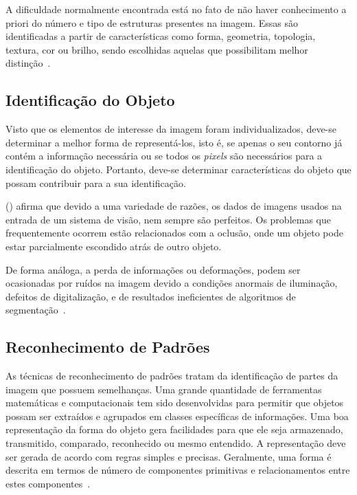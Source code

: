 A dificuldade normalmente encontrada está no fato de não haver conhecimento a priori do número e tipo de estruturas presentes na imagem. Essas são identificadas a partir de características como forma, geometria, topologia, textura, cor ou brilho, sendo escolhidas aquelas que possibilitam melhor distinção~\cite{heinen2004navegaccao}.

\subsection{Identificação do Objeto}
\label{subsec:idObjeto}

Visto que os elementos de interesse da imagem foram individualizados, deve-se determinar a melhor forma de representá-los, isto é, se apenas o seu contorno já contém a informação necessária ou se todos os \textit{pixels} são necessários para a identificação do objeto. Portanto, deve-se determinar características do objeto que possam contribuir para a sua identificação.

\citeauthor{rudek2001visao} (\citeyear{rudek2001visao}) afirma que devido a uma variedade de razões, os dados de imagens usados na entrada de um sistema de visão, nem sempre são perfeitos. Os problemas que frequentemente ocorrem estão relacionados com a oclusão, onde um objeto pode estar parcialmente escondido atrás de outro objeto. 

De forma análoga, a perda de informações ou deformações, podem ser ocasionadas por ruídos na imagem devido a condições anormais de iluminação, defeitos de digitalização, e de resultados ineficientes de algoritmos de segmentação~\cite{beis1999indexing}.

\subsection{Reconhecimento de Padrões}
\label{subsec:recPadroes}

As técnicas de reconhecimento de padrões tratam da identificação de partes da imagem que possuem semelhanças. Uma grande quantidade de ferramentas matemáticas e computacionais tem sido desenvolvidas para permitir que objetos possam ser extraídos e agrupados em classes específicas de informações. Uma boa representação da forma do objeto gera facilidades para que ele seja armazenado, transmitido, comparado, reconhecido ou mesmo entendido. A representação deve ser gerada de acordo com regras simples e precisas. Geralmente, uma forma é descrita em termos de número de componentes primitivas e relacionamentos entre estes componentes~\cite{rudek2001visao}.

